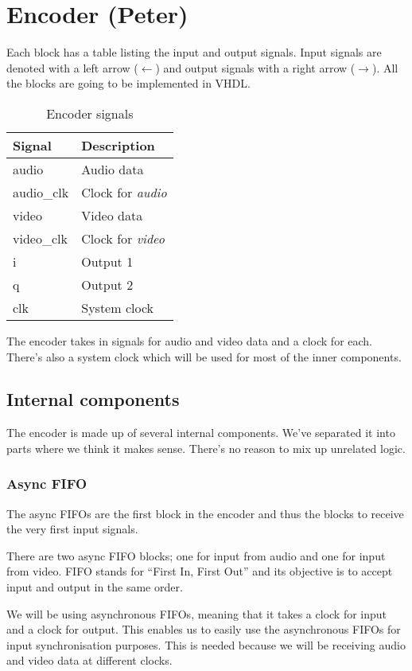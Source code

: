 \section{Encoder (Peter)}
Each block has a table listing the input and output signals. Input signals are denoted with a left arrow ($\leftarrow$) and output signals with a right arrow ($\rightarrow$). All the blocks are going to be implemented in VHDL.
\begin{table}[!h]
\centering%
\caption{Encoder signals}\label{tab:table}
\begin{tabular}{l|l}
  \textbf{Signal} & \textbf{Description}\\\hline\hline
   audio & Audio data\\\hline
   audio\_clk & Clock for \emph{audio}\\\hline
   video & Video data\\\hline
   video\_clk & Clock for \emph{video}\\\hline
   i & Output 1\\\hline
   q & Output 2\\\hline
   clk & System clock\\
\end{tabular}
\end{table}
The encoder takes in signals for audio and video data and a clock for each. There’s also a system clock which will be used for most of the inner components.

\subsection{Internal components}
The encoder is made up of several internal components. We’ve separated it into parts where we think it makes sense. There’s no reason to mix up unrelated logic.

\subsubsection{Async FIFO}
The async FIFOs are the first block in the encoder and thus the blocks to receive the very first input signals.

There are two async FIFO blocks; one for input from audio and one for input from video. FIFO stands for “First In, First Out” and its objective is to accept input and output in the same order.

We will be using asynchronous FIFOs, meaning that it takes a clock for input and a clock for output. This enables us to easily use the asynchronous FIFOs for input synchronisation purposes. This is needed because we will be receiving audio and video data at different clocks.

